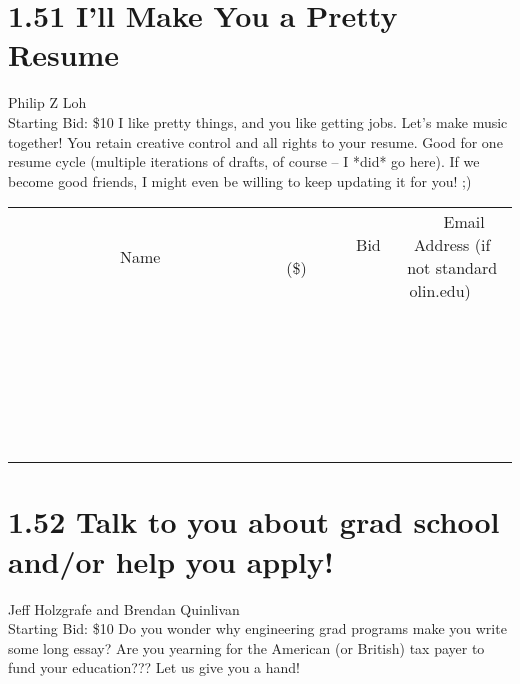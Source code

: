 \documentclass[11pt]{article}
\begin{document}
\section*{1.51 I'll Make You a Pretty Resume}
Philip Z Loh
\\
Starting Bid: \$10
\newline
I like pretty things, and you like getting jobs. Let's make music together! You retain creative control and all rights to your resume. Good for one resume cycle (multiple iterations of drafts, of course -- I *did* go here). If we become good friends, I might even be willing to keep updating it for you! ;)
\\[6ex]
\begin{tabular}{c c c}
~~~~~~~~~~~~~Name~~~~~~~~~~~~~ & ~~~~~~~~~Bid (\$)~~~~~~~~~  & ~~~Email Address (if not standard olin.edu)~~~\\
 & & \\
\hline
 & & \\
\hline
 & & \\
\hline
 & & \\
\hline
 & & \\
\hline
 & & \\
\hline
 & & \\
\hline
 & & \\
\hline
 & & \\
\hline
 & & \\
\hline
 & & \\
\hline
 & & \\
\hline
 & & \\
\hline
 & & \\
\hline
 & & \\
\hline
 & & \\
\hline
 & & \\
\hline
 & & \\
\hline
 & & \\
\hline
 & & \\
\hline
 & & \\
\hline
 & & \\
\hline
 & & \\
\hline
 & & \\
\hline
 & & \\
\hline
 & & \\
\hline
\end{tabular}
\newpage
\section*{1.52 Talk to you about grad school and/or help you apply!}
Jeff Holzgrafe and Brendan Quinlivan
\\
Starting Bid: \$10
\newline
Do you wonder why engineering grad programs make you write some long essay? Are you yearning for the American (or British) tax payer to fund your education??? Let us give you a hand!
 
\end{document}
